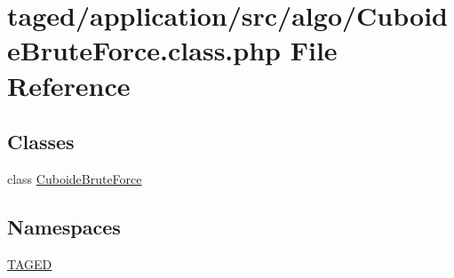 \hypertarget{_cuboide_brute_force_8class_8php}{}\section{taged/application/src/algo/\+Cuboide\+Brute\+Force.class.\+php File Reference}
\label{_cuboide_brute_force_8class_8php}
\subsection*{Classes}
\begin{DoxyCompactItemize}
\item 
class \hyperlink{class_cuboide_brute_force}{Cuboide\+Brute\+Force}
\end{DoxyCompactItemize}
\subsection*{Namespaces}
\begin{DoxyCompactItemize}
\item 
 \hyperlink{namespace_t_a_g_e_d}{T\+A\+G\+ED}
\end{DoxyCompactItemize}
